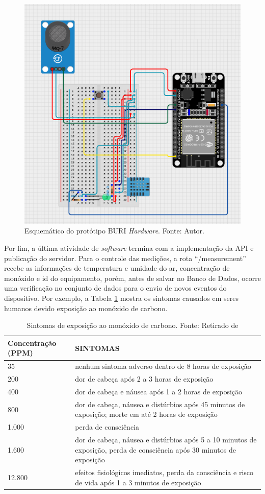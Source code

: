 \begin{figure}[ht]
    \centering
    \includegraphics[width=.68\textwidth]{img/buri_esquematico.png}
    \caption{Esquemático do protótipo BURI \textit{Hardware}. Fonte: Autor.}\label{figSchematicBuriHardware}
\end{figure}

Por fim, a última atividade de \textit{software} termina com a implementação da API e publicação do servidor.  
Para o controle das medições, a rota ``/measurement'' recebe as informações de temperatura e umidade do ar, concentração de monóxido 
e id do equipamento, porém, antes de salvar no Banco de Dados, ocorre uma verificação no conjunto de dados para o envio de 
novos eventos do dispositivo. Por exemplo, a Tabela \ref{tabEfeitosCO} mostra os sintomas causados em seres humanos devido exposição ao 
monóxido de carbono.

\begin{table}[h!]
    \centering
    \caption{Sintomas de exposição ao monóxido de carbono. Fonte: Retirado de \cite{seguranca-contra-incendios}}\label{tabEfeitosCO}
    \begin{tabular}{p{4cm}|p{10cm}}
    \toprule
    \textbf{Concentração (PPM)} & \textbf{SINTOMAS} \\ \midrule
    35 & nenhum sintoma adverso dentro de 8 horas de exposição \\ \midrule
    200 & dor de cabeça após 2 a 3 horas de exposição \\ \midrule
    400 & dor de cabeça e náusea após 1 a 2 horas de exposição \\ \midrule
    800 & dor de cabeça, náusea e distúrbios após 45 minutos de exposição; morte em até 2 horas de exposição \\ \midrule
    1.000 & perda de consciência \\ \midrule
    1.600 & dor de cabeça, náusea e distúrbios após 5 a 10 minutos de exposição, perda de consciência após 30 minutos de exposição \\ \midrule
    12.800 & efeitos fisiológicos imediatos, perda da consciência e risco de vida após 1 a 3 minutos de exposição \\ \bottomrule
    \end{tabular}
\end{table}



